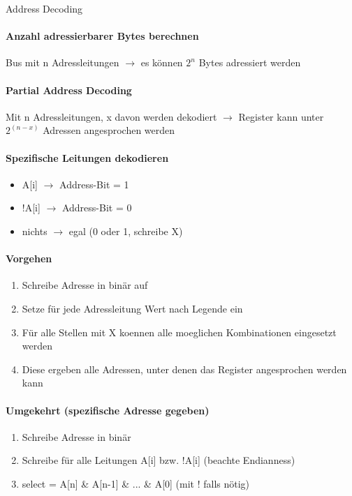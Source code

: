 \begin{KR}{Address Decoding}
    \paragraph{Anzahl adressierbarer Bytes berechnen}
    Bus mit n Adressleitungen $\rightarrow$ es können $2^n$ Bytes adressiert werden
    
    \paragraph{Partial Address Decoding}
    Mit n Adressleitungen, x davon werden dekodiert $\rightarrow$ Register kann unter $2^{(n-x)}$ Adressen angesprochen werden
    
    \paragraph{Spezifische Leitungen dekodieren}
    \begin{itemize}
        \item A[i] $\rightarrow$ Address-Bit = 1
        \item !A[i] $\rightarrow$ Address-Bit = 0
        \item nichts $\rightarrow$ egal (0 oder 1, schreibe X)
    \end{itemize}
    
    \paragraph{Vorgehen}
    \begin{enumerate}
        \item Schreibe Adresse in binär auf
        \item Setze für jede Adressleitung Wert nach Legende ein
        \item Für alle Stellen mit X koennen alle moeglichen Kombinationen eingesetzt werden
        \item Diese ergeben alle Adressen, unter denen das Register angesprochen werden kann
    \end{enumerate}
    
    \paragraph{Umgekehrt (spezifische Adresse gegeben)}
    \begin{enumerate}
        \item Schreibe Adresse in binär
        \item Schreibe für alle Leitungen A[i] bzw. !A[i] (beachte Endianness)
        \item select = A[n] \& A[n-1] \& ... \& A[0] (mit ! falls nötig)
    \end{enumerate}
\end{KR}

